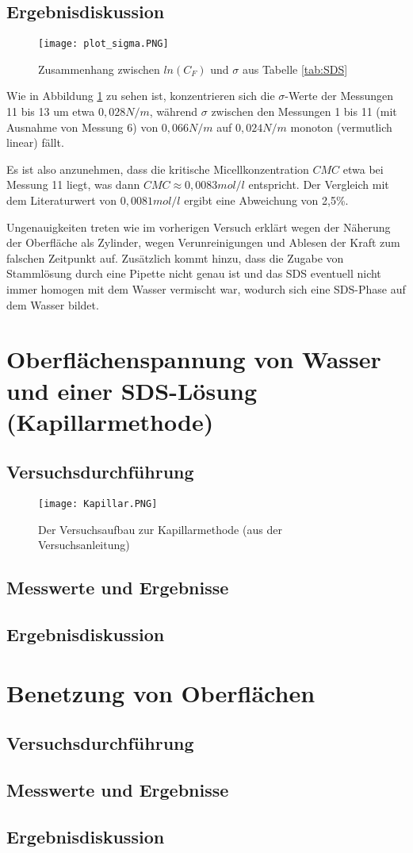 \documentclass{scrartcl}
\begin{document}
\subsection{Ergebnisdiskussion}

\begin{figure}[H]
  \centering
    \texttt{[image: plot\_sigma.PNG]}
  \caption{Zusammenhang zwischen $ln(C_{F})$ und $\sigma$ aus Tabelle \ref{tab:SDS}}
  \label{fig:plot_sigma}
\end{figure}

Wie in Abbildung \ref{fig:plot_sigma} zu sehen ist, konzentrieren sich die $\sigma$-Werte der Messungen 11 bis 13 um etwa $0,028N/m$, während $\sigma$ zwischen den Messungen 1 bis 11 (mit Ausnahme von Messung 6) von $0,066N/m$ auf $0,024N/m$ monoton (vermutlich linear) fällt.

Es ist also anzunehmen, dass die kritische Micellkonzentration $CMC$ etwa bei Messung 11 liegt, was dann $CMC \approx 0,0083 mol/l$ entspricht. Der Vergleich mit dem Literaturwert von $0,0081 mol/l$ ergibt eine Abweichung von 2,5\%.

Ungenauigkeiten treten wie im vorherigen Versuch erklärt wegen der Näherung der Oberfläche als Zylinder, wegen Verunreinigungen und Ablesen der Kraft zum falschen Zeitpunkt auf.
Zusätzlich kommt hinzu, dass die Zugabe von Stammlösung durch eine Pipette nicht genau ist und das SDS eventuell nicht immer homogen mit dem Wasser vermischt war, wodurch sich eine SDS-Phase auf dem Wasser bildet.
\newpage 
\section{Oberflächenspannung von Wasser und einer SDS-Lösung (Kapillarmethode)}
\subsection{Versuchsdurchführung}
\begin{figure}[H]
  \centering
    \texttt{[image: Kapillar.PNG]}
  \caption{Der Versuchsaufbau zur Kapillarmethode (aus der Versuchsanleitung)}
  \label{fig:Kapillar}
\end{figure}
\subsection{Messwerte und Ergebnisse}
\subsection{Ergebnisdiskussion}

\newpage
\section{Benetzung von Oberflächen}
\subsection{Versuchsdurchführung}
\subsection{Messwerte und Ergebnisse}
\subsection{Ergebnisdiskussion}
\end{document}
